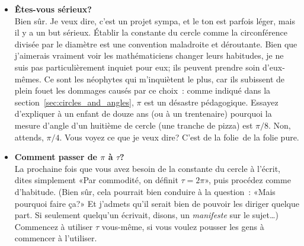 \begin{itemize}

  \item \textbf{Êtes-vous sérieux\ns?} \\ Bien sûr. Je veux dire, c'est un projet
  sympa, et le ton est parfois léger, mais il y a un but sérieux. Établir la
  constante du cercle comme la circonférence divisée par le diamètre est une
  convention maladroite et déroutante. Bien que j'aimerais vraiment voir les
  mathématiciens changer leurs habitudes, je ne suis pas particulièrement
  inquiet pour eux\ns; ils peuvent prendre soin d'eux-mêmes. Ce sont les
  néophytes qui m'inquiètent le plus, car ils subissent de plein fouet les
  dommages causés par ce choix~: comme indiqué dans la section~\ref{sec:circles_and_angles}, $\pi$ est
  un désastre pédagogique. Essayez d'expliquer à un enfant de douze ans (ou à un
  trentenaire) pourquoi la mesure d'angle d'un huitième de cercle (une 
  tranche de pizza) est $\pi/8$. Non, attends, $\pi/4$. Vous voyez ce
  que je veux dire\ns? C'est de la folie\textellipsis\ de la folie pure.

  \item \textbf{Comment passer de $\pi$ à $\tau$\ns?} \\ La prochaine fois que
  vous avez besoin de la constante du cercle à l'écrit, dites
  simplement «\ns Par commodité, on définit $\tau=2\pi$\ns », puis procédez comme
  d'habitude. (Bien sûr, cela pourrait bien conduire à la question~:
  «\ns Mais pourquoi faire ça\ns?\ns » Et j'admets qu'il serait bien
  de pouvoir les diriger quelque part. Si seulement quelqu'un écrivait, disons, un
  \emph{manifeste} sur le sujet\ldots) Commencez à utiliser $\tau$ vous-même, si
  vous voulez pousser les gens à commencer à l'utiliser.


\end{itemize}
